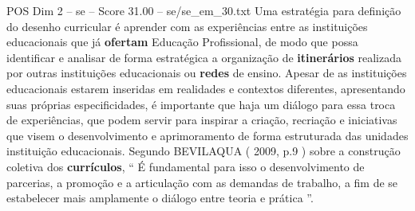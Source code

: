 \begin{textsample}{POS Dim 2 – se – Score 31.00 – se/se\_em\_30.txt}
Uma estratégia para definição do desenho curricular é aprender com as experiências entre as instituições educacionais que já \textbf{ofertam} Educação Profissional, de modo que possa identificar e analisar de forma estratégica a organização de \textbf{itinerários} realizada por outras instituições educacionais ou \textbf{redes} de ensino.
Apesar de as instituições educacionais estarem inseridas em realidades e contextos diferentes, apresentando suas próprias especificidades, é importante que haja um diálogo para essa troca de experiências, que podem servir para inspirar a criação, recriação e iniciativas que visem o desenvolvimento e aprimoramento de forma estruturada das unidades instituição educacionais.
Segundo BEVILAQUA ( 2009, p.9 ) sobre a construção coletiva dos \textbf{currículos}, “ É fundamental para isso o desenvolvimento de parcerias, a promoção e a articulação com as demandas de trabalho, a fim de se estabelecer mais amplamente o diálogo entre teoria e prática ”.

\end{textsample}
